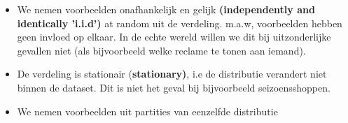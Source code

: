 \documentclass[10pt,a4paper,twoside]{article}
\begin{document}
\begin{itemize}
\item We nemen voorbeelden onafhankelijk en gelijk {\bf(independently and identically 'i.i.d')} at random uit de verdeling. m.a.w, voorbeelden hebben geen invloed op elkaar. In de echte wereld willen we dit bij uitzonderlijke gevallen niet (als bijvoorbeeld welke reclame te tonen aan iemand).
\item De verdeling is stationair {(\bf stationary)}, i.e de distributie verandert niet binnen de dataset. Dit is niet het geval bij bijvoorbeeld seizoensshoppen. 
	\item We nemen voorbeelden uit partities van eenzelfde distributie
\end{itemize}

\newpage


\end{document}
